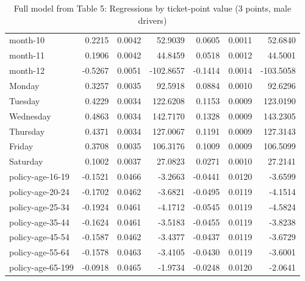 \documentclass[10pt]{article}
\begin{document}
\begin{table}[ht]
\begin{tabular}{lrrrrrr}
  month-10 & 0.2215 & 0.0042 & 52.9039 & 0.0605 & 0.0011 & 52.6840 \\ 
  month-11 & 0.1906 & 0.0042 & 44.8459 & 0.0518 & 0.0012 & 44.5001 \\ 
  month-12 & -0.5267 & 0.0051 & -102.8657 & -0.1414 & 0.0014 & -103.5058 \\ 
  Monday & 0.3257 & 0.0035 & 92.5918 & 0.0884 & 0.0010 & 92.6296 \\ 
  Tuesday & 0.4229 & 0.0034 & 122.6208 & 0.1153 & 0.0009 & 123.0190 \\ 
  Wednesday & 0.4863 & 0.0034 & 142.7170 & 0.1328 & 0.0009 & 143.2305 \\ 
  Thursday & 0.4371 & 0.0034 & 127.0067 & 0.1191 & 0.0009 & 127.3143 \\ 
  Friday & 0.3708 & 0.0035 & 106.3176 & 0.1009 & 0.0009 & 106.5099 \\ 
  Saturday & 0.1002 & 0.0037 & 27.0823 & 0.0271 & 0.0010 & 27.2141 \\ 
  policy-age-16-19 & -0.1521 & 0.0466 & -3.2663 & -0.0441 & 0.0120 & -3.6599 \\ 
  policy-age-20-24 & -0.1702 & 0.0462 & -3.6821 & -0.0495 & 0.0119 & -4.1514 \\ 
  policy-age-25-34 & -0.1924 & 0.0461 & -4.1712 & -0.0545 & 0.0119 & -4.5824 \\ 
  policy-age-35-44 & -0.1624 & 0.0461 & -3.5183 & -0.0455 & 0.0119 & -3.8238 \\ 
  policy-age-45-54 & -0.1587 & 0.0462 & -3.4377 & -0.0437 & 0.0119 & -3.6729 \\ 
  policy-age-55-64 & -0.1578 & 0.0463 & -3.4105 & -0.0430 & 0.0119 & -3.6001 \\ 
  policy-age-65-199 & -0.0918 & 0.0465 & -1.9734 & -0.0248 & 0.0120 & -2.0641 \\ 
   \hline
\end{tabular}
\caption{Full model from Table 5: Regressions by ticket-point value (3 points, male drivers)} 
\label{tab_5_3_pts_M}
\end{table}


\clearpage
\pagebreak



\end{document}

